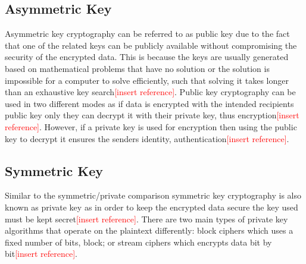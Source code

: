 \documentclass[12pt,twoside,a4paper]{report}
\begin{document}
    
    \subsection{Asymmetric Key}
    Asymmetric key cryptography can be referred to as public key due to the fact that one of the related keys can be publicly available without compromising the security of the encrypted data.
    This is because the keys are usually generated based on mathematical problems that have no solution or the solution is impossible for a computer to solve efficiently, such that solving it takes longer than an exhaustive key search\textcolor{red}{[insert reference]}.
    Public key cryptography can be used in two different modes as if data is encrypted with the intended recipients public key only they can decrypt it with their private key, thus encryption\textcolor{red}{[insert reference]}.
    However, if a private key is used for encryption then using the public key to decrypt it ensures the senders identity, authentication\textcolor{red}{[insert reference]}.
    
    \subsection{Symmetric Key}
    Similar to the symmetric/private comparison symmetric key cryptography is also known as private key as in order to keep the encrypted data secure the key used must be kept secret\textcolor{red}{[insert reference]}. There are two main types of private key algorithms that operate on the plaintext differently: block ciphers which uses a fixed number of bits, block; or stream ciphers which encrypts data bit by bit\textcolor{red}{[insert reference]}.
    
\end{document}
